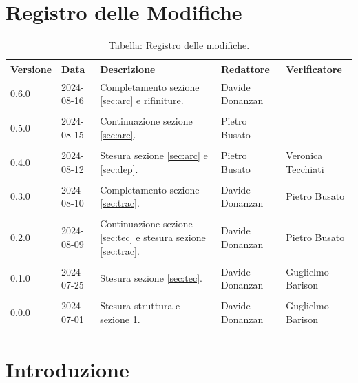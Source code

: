 \documentclass[8pt]{article}
\begin{document}
\section*{Registro delle Modifiche}
\begin{table}[ht!]	
	\centering
	\begin{tabular}{p{1.2cm} p{2cm} p{5cm} p{3cm} p{3cm}}
		\toprule
		\textbf{Versione}& \textbf{Data} & \textbf{Descrizione} & \textbf{Redattore} & \textbf{Verificatore} \\
		\midrule
  		    0.6.0 & 2024-08-16 & Completamento sezione \ref{sec:arc} e rifiniture. & Davide Donanzan &  \\\\
  		    0.5.0 & 2024-08-15 & Continuazione sezione \ref{sec:arc}. & Pietro Busato &  \\\\
  		    0.4.0 & 2024-08-12 & Stesura sezione \ref{sec:arc} e \ref{sec:dep}. & Pietro Busato & Veronica Tecchiati \\\\
  		    0.3.0 & 2024-08-10 & Completamento sezione \ref{sec:trac}. & Davide Donanzan & Pietro Busato \\\\
  		    0.2.0 & 2024-08-09 & Continuazione sezione \ref{sec:tec} e stesura sezione \ref{sec:trac}. & Davide Donanzan & Pietro Busato \\\\
		    0.1.0 & 2024-07-25 & Stesura sezione \ref{sec:tec}. & Davide Donanzan & Guglielmo Barison \\\\
    		0.0.0 & 2024-07-01 & Stesura struttura e sezione \ref{sec:intro}. & Davide Donanzan & Guglielmo Barison \\
		\bottomrule
	\end{tabular}
	\caption*{Tabella: Registro delle modifiche.}
	\label{table:Registro delle modifiche}
\end{table}
\newpage
\tableofcontents
\newpage
\listoffigures
\newpage
\listoftables
\newpage
\justifying
\section{Introduzione}\label{sec:intro}
\end{document}
